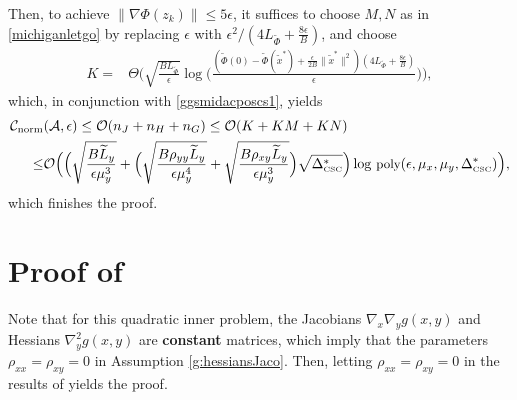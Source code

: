 \documentclass{osudissert96}
\begin{document}
\hspace{-0.15cm}Then, to achieve $\|\nabla \Phi (z_k)\|\leq 5\epsilon$, it suffices to  choose $M,N$ as in \cref{michiganletgo} by replacing $\epsilon$ with $\epsilon^2/(4L_{\widetilde \Phi}+ \frac{8\epsilon}{B})$, and choose
\begin{align*}
K =& \Theta\Big( \sqrt{\frac{BL_{\widetilde \Phi}}{\epsilon}}\log\Big(\frac{(\widetilde\Phi(0) -\widetilde\Phi(\widetilde x^*)+\frac{\epsilon}{2B} \|\widetilde x^*\|^2)(4L_{\widetilde \Phi}+ \frac{8\epsilon}{B})}{\epsilon}\Big)\Big), 
\end{align*}
which, in conjunction with \cref{ggsmidacposcs1}, yields
\begin{align*}
\mathcal{C}_{\text{\normalfont norm}}&(\mathcal{A},\epsilon) \leq \mathcal{O}(n_J+n_H + n_G)\leq \mathcal{O}(K+KM+KN)   \nonumber
\\\leq& \mathcal{O}\Big( \Big( \sqrt{\frac{B\widetilde L_y}{\epsilon\mu_y^3}}+\Big(\sqrt{\frac{B\rho_{yy}\widetilde L_y}{\epsilon\mu_y^{4}}} +  \sqrt{\frac{B\rho_{xy}\widetilde L_y}{\epsilon\mu_y^3}}\Big)\sqrt{\Delta^*_{\text{\normalfont\tiny CSC}}}\Big)\log\, {\small \text{poly}(\epsilon,\mu_x,\mu_y,\Delta^*_{\text{\normalfont\tiny CSC}})}\Big),
\end{align*}
which finishes the proof. 
\section{Proof of }
Note that for this quadratic inner problem, the Jacobians $\nabla_x\nabla_y g(x,y)$ and Hessians $\nabla_y^2 g(x,y)$ are {\bf constant} matrices, which imply that the parameters $\rho_{xx}=\rho_{xy}=0$ in Assumption \ref{g:hessiansJaco}. Then, letting $\rho_{xx}=\rho_{xy}=0$ in the results of  yields the proof. 
\end{document}
